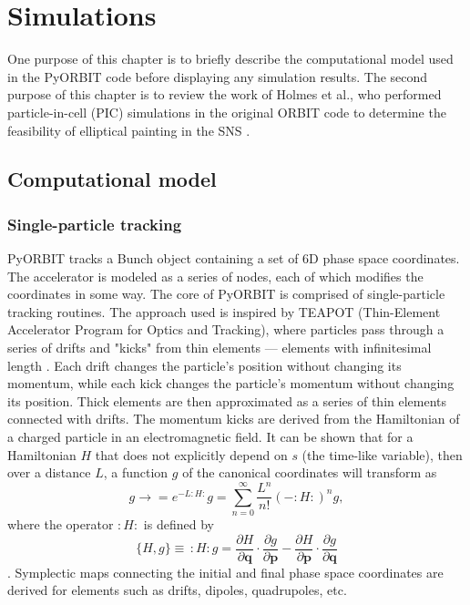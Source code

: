 \chapter{Simulations} \label{chap-3}

One purpose of this chapter is to briefly describe the computational model used in the PyORBIT code before displaying any simulation results. The second purpose of this chapter is to review the work of Holmes et al., who performed particle-in-cell (PIC) simulations in the original ORBIT code to determine the feasibility of elliptical painting in the SNS \cite{Holmes2018}. 



\section{Computational model}

\subsection{Single-particle tracking}

PyORBIT tracks a Bunch object containing a set of 6D phase space coordinates. The accelerator is modeled as a series of nodes, each of which modifies the coordinates in some way. The core of PyORBIT is comprised of single-particle tracking routines. The approach used is inspired by TEAPOT (Thin-Element Accelerator Program for Optics and Tracking), where particles pass through a series of drifts and "kicks" from thin elements — elements with infinitesimal length \cite{Schachinger1987}. Each drift changes the particle's position without changing its momentum, while each kick changes the particle's momentum without changing its position. Thick elements are then approximated as a series of thin elements connected with drifts. The momentum kicks are derived from the Hamiltonian of a charged particle in an electromagnetic field. It can be shown that for a Hamiltonian $H$ that does not explicitly depend on $s$ (the time-like variable), then over a distance $L$, a function $g$ of the canonical coordinates will transform as
%
\begin{equation}
    g \rightarrow 
    = e^{-L:H:} g
    = \sum_{n=0}^{\infty}{\frac{L^n}{n!} (-:H:)^n g},
\end{equation}
%
where the operator $:H:$ is defined by
%
\begin{equation}
    \{H, g\} \equiv \, :H: g =
    \frac{\partial{H}}{\partial{\mathbf{q}}}
    \cdot
    \frac{\partial{g}}{\partial{\mathbf{p}}}
    -
    \frac{\partial{H}}{\partial{\mathbf{p}}}
    \cdot
    \frac{\partial{g}}{\partial{\mathbf{q}}}
\end{equation}
%
\cite{Dragt2018, Forest1998}. Symplectic maps connecting the initial and final phase space coordinates are derived for elements such as drifts, dipoles, quadrupoles, etc.

